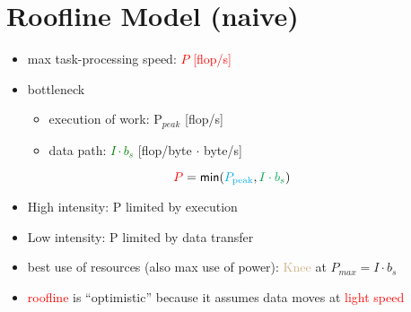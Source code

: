 \section*{Roofline Model (naive)}
\begin{minipage}{.6\linewidth}
  \flushleft
  \begin{itemize}
  \item max task-processing speed: \textcolor{red}{$P$ [flop/s]}
  \item bottleneck
    \begin{itemize}[label=-]
    \item execution of work: P$_{peak}$ [flop/s]
    \item data path: \textcolor{Green}{$I\cdot b_s$} [flop/byte $\cdot$ byte/s]
    \end{itemize}
  \end{itemize}
\[
\textcolor{red}{P} = \textsf{min}(\textcolor{Cyan}{P_{\text{peak}}}, \textcolor{Green}{I\cdot b_{s}})
\]
  \begin{itemize}
  \item High intensity: P limited by execution
  \item Low intensity: P limited by data transfer
  \item best use of resources (also max use of power): \textcolor{Tan}{Knee} at $P_{max} = I \cdot b_s$
  \item \textcolor{red}{roofline} is ``optimistic'' because it assumes data moves at \textcolor{red}{light speed}
  \end{itemize}
\end{minipage}
\begin{minipage}{.4\linewidth}
\end{minipage}

